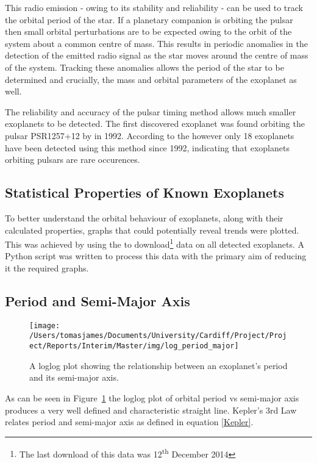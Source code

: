 \documentclass{report}
\begin{document}
This radio emission - owing to its stability and reliability - can be used to track the orbital period of the star. If a planetary companion is orbiting the pulsar then small orbital perturbations are to be expected owing to the orbit of the system about a common centre of mass. This results in periodic anomalies in the detection of the emitted radio signal as the star moves around the centre of mass of the system. Tracking these anomalies allows the period of the star to be determined and crucially, the mass and orbital parameters of the exoplanet as well.

The reliability and accuracy of the pulsar timing method allows much smaller exoplanets to be detected. The first discovered exoplanet was found orbiting the pulsar PSR1257+12 by \citeauthor{first} in 1992. According to the \textcite{exo} however only 18 exoplanets have been detected using this method since 1992, indicating that exoplanets orbiting pulsars are rare occurences.


\subsection{Statistical Properties of Known Exoplanets}
To better understand the orbital behaviour of exoplanets, along with their calculated properties, graphs that could potentially reveal trends were plotted. This was achieved by using the \textcite{exo} to download\footnote{The last download of this data was 12\textsuperscript{th} December 2014} data on all detected exoplanets. A Python script was written to process this data with the primary aim of reducing it the required graphs.

\subsection*{Period and Semi-Major Axis}
\begin{figure}[H]
\centering
    \texttt{[image: /Users/tomasjames/Documents/University/Cardiff/Project/Project/Reports/Interim/Master/img/log\_period\_major]}
\caption{A loglog plot showing the relationship between an exoplanet's period and its semi-major axis.}\label{log_period_major}
\end{figure}

As can be seen in Figure~\ref{log_period_major} the loglog plot of orbital period vs semi-major axis produces a very well defined and characteristic straight line. Kepler's 3rd Law relates period and semi-major axis as defined in equation \ref{Kepler}.
\end{document}
